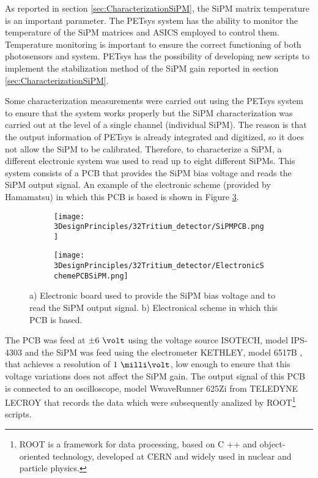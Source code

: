 As reported in section \ref{sec:CharacterizationSiPM}, the SiPM matrix temperature is an important parameter. The PETsys system has the ability to monitor the temperature of the SiPM matrices and ASICS employed to control them. Temperature monitoring is important to ensure the correct functioning of both photosensors and system. PETsys has the possibility of developing new scripts to implement the stabilization method of the SiPM gain reported in section \ref{sec:CharacterizationSiPM}.

Some characterization measurements were carried out using the PETsys system to ensure that the system works properly but the SiPM characterization was carried out at the level of a single channel (individual SiPM). The reason is that the output information of PETsys is already integrated and digitized, so it does not allow the SiPM to be calibrated. Therefore, to characterize a SiPM, a different electronic system was used to read up to eight different SiPMs. This system consists of a PCB that provides the SiPM bias voltage and reads the SiPM output signal. An example of the electronic scheme (provided by Hamamatsu) in which this PCB is based is shown in Figure \ref{fig:PCBSiPM}.

\begin{figure}
\centering
    \begin{subfigure}[b]{0.5\textwidth}
    \centering
    \texttt{[image: 3DesignPrinciples/32Tritium\_detector/SiPMPCB.png]}  
    \caption{\label{subfig:ElectronicBoardSiPM}}
    \end{subfigure}
    \hfill
    \begin{subfigure}[b]{0.45\textwidth}
    \centering
    \texttt{[image: 3DesignPrinciples/32Tritium\_detector/ElectronicSchemePCBSiPM.png]}  
    \caption{\label{subfig:ElectronicSchemePCBSiPM}}
    \end{subfigure}
    \hfill
 \caption{a) Electronic board used to provide the SiPM bias voltage and to read the SiPM output signal. b) Electronical scheme in which this PCB is based.}
 \label{fig:PCBSiPM}
\end{figure}
The PCB was feed at $\pm6~\volt$ using the voltage source ISOTECH, model IPS-4303 \cite{VoltageSourceISOTECH} and the SiPM was feed using the electrometer KETHLEY, model 6517B \cite{VoltageSourceKethley}, that achieves a resolution of $1~\milli\volt$, low enough to ensure that this voltage variations does not affect the SiPM gain. The output signal of this PCB is connected to an oscilloscope, model WwaveRunner 625Zi from TELEDYNE LECROY \cite{OscilloscopeIFIMED} that records the data which were subsequently analized by ROOT\footnote{ROOT is a framework for data processing, based on C ++ and object-oriented technology, developed at CERN and widely used in nuclear and particle physics.} scripts.